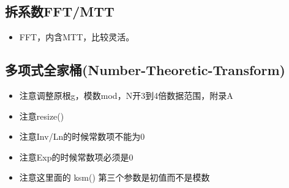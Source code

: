 
\subsection{拆系数FFT/MTT}
\begin{itemize}
    \item FFT，内含MTT，比较灵活。
\end{itemize} 


\subsection{多项式全家桶(Number-Theoretic-Transform)}
\begin{itemize}
    \item 注意调整原根g，模数mod，N开3到4倍数据范围，附录A
    \item 注意resize()
    \item 注意Inv/Ln的时候常数项不能为0
    \item 注意Exp的时候常数项必须是0
    \item 注意这里面的 ksm() 第三个参数是初值而不是模数
\end{itemize}



